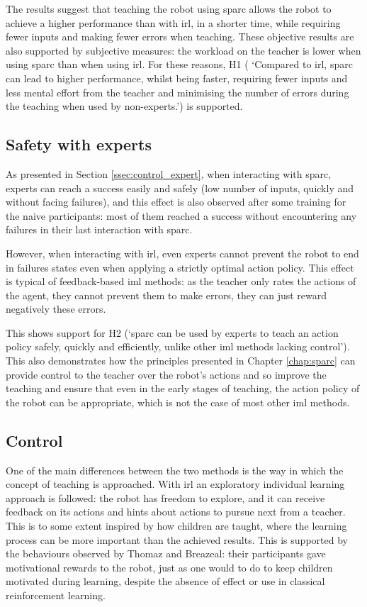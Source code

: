 The results suggest that teaching the robot using \gls{sparc} allows the robot to achieve a higher performance than with \gls{irl}, in a shorter time, while requiring fewer inputs and making fewer errors when teaching. These objective results are also supported by subjective measures: the workload on the teacher is lower when using \gls{sparc} than when using \gls{irl}. For these reasons, H1 ( `Compared to \gls{irl}, \gls{sparc} can lead to higher performance, whilst being faster, requiring fewer inputs and less mental effort from the teacher and minimising the number of errors during the teaching when used by non-experts.') is supported.

\subsection{Safety with experts}

As presented in Section \ref{ssec:control_expert}, when interacting with \gls{sparc}, experts can reach a success easily and safely (low number of inputs, quickly and without facing failures), and this effect is also observed after some training for the naive participants: most of them reached a success without encountering any failures in their last interaction with \gls{sparc}.

However, when interacting with \gls{irl}, even experts cannot prevent the robot to end in failures states even when applying a strictly optimal action policy. This effect is typical of feedback-based \gls{iml} methods: as the teacher only rates the actions of the agent, they cannot prevent them to make errors, they can just reward negatively these errors.

This shows support for H2 (`\gls{sparc} can be used by experts to teach an action policy safely, quickly and efficiently, unlike other \gls{iml} methods lacking control'). This also demonstrates how the principles presented in Chapter \ref{chap:sparc} can provide control to the teacher over the robot's actions and so improve the teaching and ensure that even in the early stages of teaching, the action policy of the robot can be appropriate, which is not the case of most other \gls{iml} methods.

\subsection{Control}
\label{sec:control}

One of the main differences between the two methods is the way in which the concept of teaching is approached. With \gls{irl} an exploratory individual learning approach is followed: the robot has freedom to explore, and it can receive feedback on its actions and hints about actions to pursue next from a teacher. This is to some extent inspired by how children are taught, where the learning process can be more important than the achieved results. This is supported by the behaviours observed by Thomaz and Breazeal: their participants gave motivational rewards to the robot, just as one would to do to keep children motivated during learning, despite the absence of effect or use in classical reinforcement learning.

